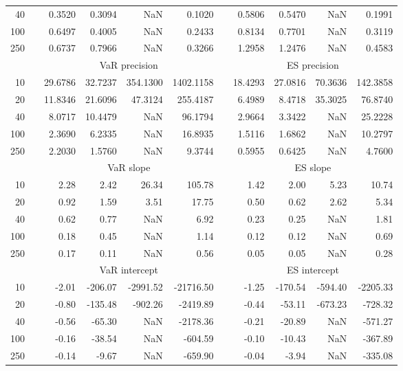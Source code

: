 {{\begin{longtable}{rr rrrr r rrrr}
40 && 0.3520  & 0.3094  &    NaN & 0.1020 && 0.5806  & 0.5470  &    NaN & 0.1991 \\ 
100 && 0.6497  & 0.4005  &    NaN & 0.2433 && 0.8134  & 0.7701  &    NaN & 0.3119 \\ 
250 && 0.6737  & 0.7966  &    NaN & 0.3266 && 1.2958  & 1.2476  &    NaN & 0.4583 \\ 
\hline 
 & & \multicolumn{4}{c}{VaR precision} &&  \multicolumn{4}{c}{ES precision} \\ \cline{3-6}  \cline{8-11}
10 && 29.6786 & 32.7237 & 354.1300 & 1402.1158 & & 18.4293 & 27.0816 & 70.3636 & 142.3858 \\ 
20 && 11.8346 & 21.6096 & 47.3124 & 255.4187 & & 6.4989 & 8.4718 & 35.3025 & 76.8740 \\ 
40 && 8.0717 & 10.4479 &    NaN & 96.1794 & & 2.9664 & 3.3422 &    NaN & 25.2228 \\ 
100 && 2.3690 & 6.2335 &    NaN & 16.8935 & & 1.5116 & 1.6862 &    NaN & 10.2797 \\ 
250 && 2.2030 & 1.5760 &    NaN & 9.3744 & & 0.5955 & 0.6425 &    NaN & 4.7600 \\ 
\hline 
 & & \multicolumn{4}{c}{ VaR slope} && \multicolumn{4}{c}{ES slope} \\ \cline{3-6}  \cline{8-11}
10 && 2.28 & 2.42 & 26.34 & 105.78 && 1.42 & 2.00 & 5.23 & 10.74 \\ 
20 && 0.92 & 1.59 & 3.51 & 17.75 && 0.50 & 0.62 & 2.62 & 5.34 \\ 
40 && 0.62 & 0.77 &  NaN & 6.92 && 0.23 & 0.25 &  NaN & 1.81 \\ 
100 && 0.18 & 0.45 &  NaN & 1.14 && 0.12 & 0.12 &  NaN & 0.69 \\ 
250 && 0.17 & 0.11 &  NaN & 0.56 && 0.05 & 0.05 &  NaN & 0.28 \\ 
\hline 
 & & \multicolumn{4}{c}{ VaR intercept} &&  \multicolumn{4}{c}{ES intercept} \\ \cline{3-6}  \cline{8-11}
10 && -2.01 & -206.07 & -2991.52 & -21716.50 && -1.25 & -170.54 & -594.40 & -2205.33 \\ 
20 && -0.80 & -135.48 & -902.26 & -2419.89 && -0.44 & -53.11 & -673.23 & -728.32 \\ 
40 && -0.56 & -65.30 &  NaN & -2178.36 && -0.21 & -20.89 &  NaN & -571.27 \\ 
100 && -0.16 & -38.54 &  NaN & -604.59 && -0.10 & -10.43 &  NaN & -367.89 \\ 
250 && -0.14 & -9.67 &  NaN & -659.90 && -0.04 & -3.94 &  NaN & -335.08 \\ 

\end{longtable}}}
